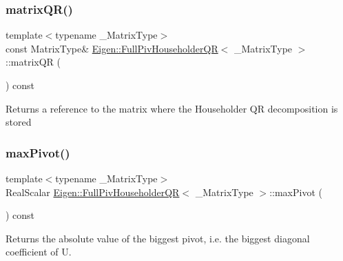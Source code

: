 \subsubsection{\texorpdfstring{matrixQR()}{matrixQR()}}
{\footnotesize\ttfamily template$<$typename \+\_\+\+Matrix\+Type$>$ \\
const Matrix\+Type\& \mbox{\hyperlink{class_eigen_1_1_full_piv_householder_q_r}{Eigen\+::\+Full\+Piv\+Householder\+QR}}$<$ \+\_\+\+Matrix\+Type $>$\+::matrix\+QR (\begin{DoxyParamCaption}{ }\end{DoxyParamCaption}) const\hspace{0.3cm}{\ttfamily [inline]}}

\begin{DoxyReturn}{Returns}
a reference to the matrix where the Householder QR decomposition is stored 
\end{DoxyReturn}
\mbox{\label{class_eigen_1_1_full_piv_householder_q_r_a7887506237a3bf912aebc9aaa8edacec}} 
\subsubsection{\texorpdfstring{maxPivot()}{maxPivot()}}
{\footnotesize\ttfamily template$<$typename \+\_\+\+Matrix\+Type$>$ \\
Real\+Scalar \mbox{\hyperlink{class_eigen_1_1_full_piv_householder_q_r}{Eigen\+::\+Full\+Piv\+Householder\+QR}}$<$ \+\_\+\+Matrix\+Type $>$\+::max\+Pivot (\begin{DoxyParamCaption}{ }\end{DoxyParamCaption}) const\hspace{0.3cm}{\ttfamily [inline]}}

\begin{DoxyReturn}{Returns}
the absolute value of the biggest pivot, i.\+e. the biggest diagonal coefficient of U. 
\end{DoxyReturn}
\mbox{\label{class_eigen_1_1_full_piv_householder_q_r_af1e4d04824084a964c1a6e51db68376f}} 
